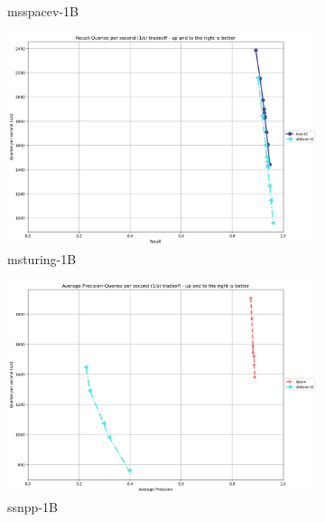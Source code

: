 \begin{figure}[ht]
\begin{subfigure}{0.48\textwidth}
      \caption{msspacev-1B}
  \end{subfigure}
  \begin{subfigure}{0.48\textwidth}
    \centering
    \includegraphics[width=\linewidth]{../t1_t2/results/T2/neurips21/msturing-1B.png}
    \caption{msturing-1B}
  \end{subfigure}
  \begin{subfigure}{0.48\textwidth}
    \centering
    \includegraphics[width=\linewidth]{../t1_t2/results/T2/neurips21/ssnpp-1B.png}
      \caption{ssnpp-1B}
  \end{subfigure}
  \begin{subfigure}{0.48\textwidth}
    \centering

\end{subfigure}
\end{figure}
